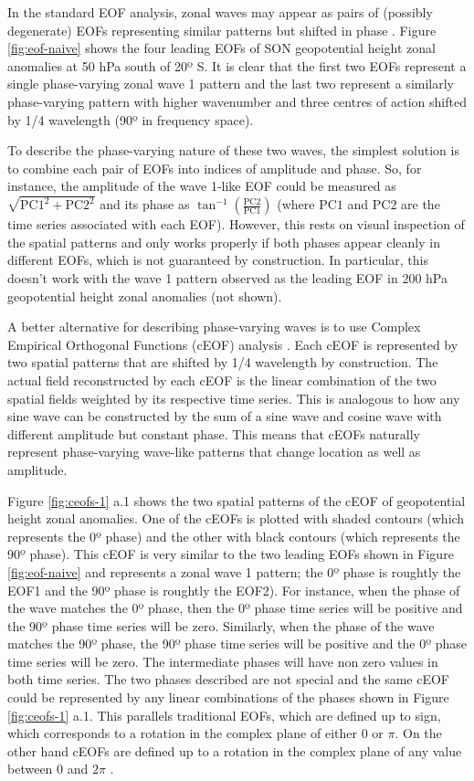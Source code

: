 \documentclass[pdflatex,sn-basic]{sn-jnl}
\theoremstyle{thmstyleone}%
\theoremstyle{thmstyletwo}%
\theoremstyle{thmstylethree}%
\begin{document}
In the standard EOF analysis, zonal waves may appear as pairs of (possibly degenerate) EOFs representing similar patterns but shifted in phase \citep{horel1984}.
Figure \ref{fig:eof-naive} shows the four leading EOFs of SON geopotential height zonal anomalies at 50 hPa south of 20º S.
It is clear that the first two EOFs represent a single phase-varying zonal wave 1 pattern and the last two represent a similarly phase-varying pattern with higher wavenumber and three centres of action shifted by 1/4 wavelength (90º in frequency space).

To describe the phase-varying nature of these two waves, the simplest solution is to combine each pair of EOFs into indices of amplitude and phase.
So, for instance, the amplitude of the wave 1-like EOF could be measured as \(\sqrt{\mathrm{PC1}^2 + \mathrm{PC2}^2}\) and its phase as \(\tan^{-1} \left ( \frac{\mathrm{PC2}}{\mathrm{PC1}} \right )\) (where \(\mathrm{PC1}\) and \(\mathrm{PC2}\) are the time series associated with each EOF).
However, this rests on visual inspection of the spatial patterns and only works properly if both phases appear cleanly in different EOFs, which is not guaranteed by construction.
In particular, this doesn't work with the wave 1 pattern observed as the leading EOF in 200 hPa geopotential height zonal anomalies (not shown).

A better alternative for describing phase-varying waves is to use Complex Empirical Orthogonal Functions (cEOF) analysis \citep{horel1984}.
Each cEOF is represented by two spatial patterns that are shifted by 1/4 wavelength by construction.
The actual field reconstructed by each cEOF is the linear combination of the two spatial fields weighted by its respective time series.
This is analogous to how any sine wave can be constructed by the sum of a sine wave and cosine wave with different amplitude but constant phase.
This means that cEOFs naturally represent phase-varying wave-like patterns that change location as well as amplitude.

Figure \ref{fig:ceofs-1} a.1 shows the two spatial patterns of the cEOF of geopotential height zonal anomalies.
One of the cEOFs is plotted with shaded contours (which represents the 0º phase) and the other with black contours (which represents the 90º phase).
This cEOF is very similar to the two leading EOFs shown in Figure \ref{fig:eof-naive} and represents a zonal wave 1 pattern; the 0º phase is roughtly the EOF1 and the 90º phase is roughtly the EOF2).
For instance, when the phase of the wave matches the 0º phase, then the 0º phase time series will be positive and the 90º phase time series will be zero.
Similarly, when the phase of the wave matches the 90º phase, the 90º phase time series will be positive and the 0º phase time series will be zero.
The intermediate phases will have non zero values in both time series.
The two phases described are not special and the same cEOF could be represented by any linear combinations of the phases shown in Figure \ref{fig:ceofs-1} a.1.
This parallels traditional EOFs, which are defined up to sign, which corresponds to a rotation in the complex plane of either 0 or \(\pi\).
On the other hand cEOFs are defined up to a rotation in the complex plane of any value between 0 and \(2\pi\) \citep{horel1984}.
\end{document}
